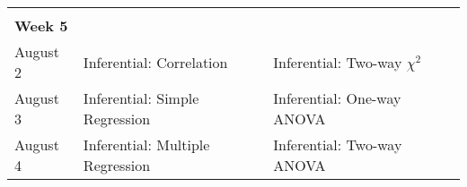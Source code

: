 \documentclass[
]{book}
\begin{document}
\begin{longtable}[]{@{}llll@{}}
\begin{minipage}[t]{0.18\columnwidth}
\strut
\end{minipage}\tabularnewline
\begin{minipage}[t]{0.09\columnwidth}\raggedright
\textbf{Week 5}\strut
\end{minipage} & \begin{minipage}[t]{0.32\columnwidth}\raggedright
\strut
\end{minipage} & \begin{minipage}[t]{0.29\columnwidth}\raggedright
\strut
\end{minipage} & \begin{minipage}[t]{0.18\columnwidth}\raggedright
\strut
\end{minipage}\tabularnewline
\begin{minipage}[t]{0.09\columnwidth}\raggedright
August 2\strut
\end{minipage} & \begin{minipage}[t]{0.32\columnwidth}\raggedright
Inferential: Correlation\strut
\end{minipage} & \begin{minipage}[t]{0.29\columnwidth}\raggedright
Inferential: Two-way \(\chi^2\)\strut
\end{minipage} & \begin{minipage}[t]{0.18\columnwidth}\raggedright
\strut
\end{minipage}\tabularnewline
\begin{minipage}[t]{0.09\columnwidth}\raggedright
August 3\strut
\end{minipage} & \begin{minipage}[t]{0.32\columnwidth}\raggedright
Inferential: Simple Regression\strut
\end{minipage} & \begin{minipage}[t]{0.29\columnwidth}\raggedright
Inferential: One-way ANOVA\strut
\end{minipage} & \begin{minipage}[t]{0.18\columnwidth}\raggedright
\strut
\end{minipage}\tabularnewline
\begin{minipage}[t]{0.09\columnwidth}\raggedright
August 4\strut
\end{minipage} & \begin{minipage}[t]{0.32\columnwidth}\raggedright
Inferential: Multiple Regression\strut
\end{minipage} & \begin{minipage}[t]{0.29\columnwidth}\raggedright
Inferential: Two-way ANOVA\strut
\end{minipage} & \begin{minipage}[t]{0.18\columnwidth}\raggedright

\end{minipage}
\end{longtable}
\end{document}
